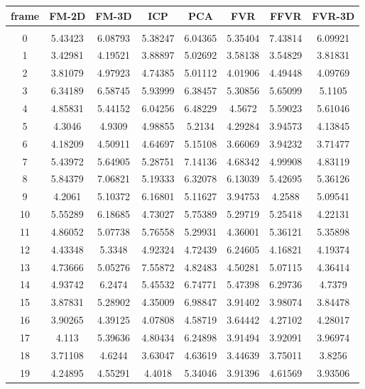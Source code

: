 \begin{center}
\begin{longtable}{cccccccc}
\hline
\textbf{frame} & \textbf{FM-2D} & \textbf{FM-3D} & \textbf{ICP} & \textbf{PCA} & \textbf{FVR} & \textbf{FFVR} & \textbf{FVR-3D} \\
\hline \\
0 & 5.43423 & 6.08793 & 5.38247 & 6.04365 & 5.35404 & 7.43814 & 6.09921\\
1 & 3.42981 & 4.19521 & 3.88897 & 5.02692 & 3.58138 & 3.54829 & 3.81831\\
2 & 3.81079 & 4.97923 & 4.74385 & 5.01112 & 4.01906 & 4.49448 & 4.09769\\
3 & 6.34189 & 6.58745 & 5.93999 & 6.38457 & 5.30856 & 5.65099 & 5.1105\\
4 & 4.85831 & 5.44152 & 6.04256 & 6.48229 & 4.5672 & 5.59023 & 5.61046\\
5 & 4.3046 & 4.9309 & 4.98855 & 5.2134 & 4.29284 & 3.94573 & 4.13845\\
6 & 4.18209 & 4.50911 & 4.64697 & 5.15108 & 3.66069 & 3.94232 & 3.71477\\
7 & 5.43972 & 5.64905 & 5.28751 & 7.14136 & 4.68342 & 4.99908 & 4.83119\\
8 & 5.84379 & 7.06821 & 5.19333 & 6.32078 & 6.13039 & 5.42695 & 5.36126\\
9 & 4.2061 & 5.10372 & 6.16801 & 5.11627 & 3.94753 & 4.2588 & 5.09541\\
10 & 5.55289 & 6.18685 & 4.73027 & 5.75389 & 5.29719 & 5.25418 & 4.22131\\
11 & 4.86052 & 5.07738 & 5.76558 & 5.29931 & 4.36001 & 5.36121 & 5.35898\\
12 & 4.43348 & 5.3348 & 4.92324 & 4.72439 & 6.24605 & 4.16821 & 4.19374\\
13 & 4.73666 & 5.05276 & 7.55872 & 4.82483 & 4.50281 & 5.07115 & 4.36414\\
14 & 4.93742 & 6.2474 & 5.45532 & 6.74771 & 5.47398 & 6.29736 & 4.7379\\
15 & 3.87831 & 5.28902 & 4.35009 & 6.98847 & 3.91402 & 3.98074 & 3.84478\\
16 & 3.90265 & 4.39125 & 4.07808 & 4.58719 & 3.64442 & 4.27102 & 4.28017\\
17 & 4.113 & 5.39636 & 4.80434 & 6.24898 & 3.91494 & 3.92091 & 3.96974\\
18 & 3.71108 & 4.6244 & 3.63047 & 4.63619 & 3.44639 & 3.75011 & 3.8256\\
19 & 4.24895 & 4.55291 & 4.4018 & 5.34046 & 3.91396 & 4.61569 & 3.93506\\

\end{longtable}
\end{center}
